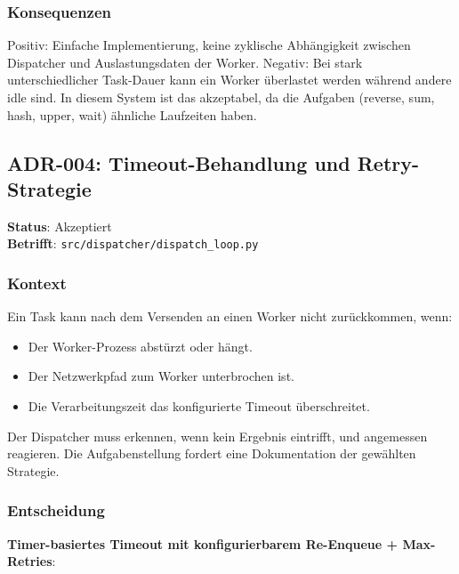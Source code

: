 \subsubsection*{Konsequenzen}

Positiv: Einfache Implementierung, keine zyklische Abhängigkeit zwischen
Dispatcher und Auslastungsdaten der Worker.
Negativ: Bei stark unterschiedlicher Task-Dauer kann ein Worker überlastet
werden während andere idle sind. In diesem System ist das akzeptabel,
da die Aufgaben (reverse, sum, hash, upper, wait) ähnliche Laufzeiten haben.

\subsection{ADR-004: Timeout-Behandlung und Retry-Strategie}

\textbf{Status}: Akzeptiert \\
\textbf{Betrifft}: \texttt{src/dispatcher/dispatch\_loop.py}

\subsubsection*{Kontext}

Ein Task kann nach dem Versenden an einen Worker nicht zurückkommen, wenn:
\begin{itemize}
  \item Der Worker-Prozess abstürzt oder hängt.
  \item Der Netzwerkpfad zum Worker unterbrochen ist.
  \item Die Verarbeitungszeit das konfigurierte Timeout überschreitet.
\end{itemize}

Der Dispatcher muss erkennen, wenn kein Ergebnis eintrifft, und
angemessen reagieren. Die Aufgabenstellung fordert eine Dokumentation
der gewählten Strategie.

\subsubsection*{Entscheidung}

\textbf{Timer-basiertes Timeout mit konfigurierbarem Re-Enqueue + Max-Retries}:

